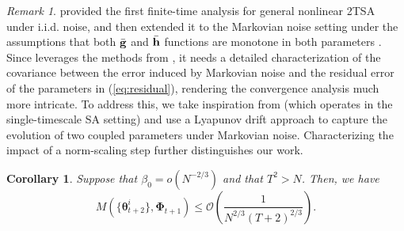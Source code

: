 \documentclass{article} %
\def\eqref#1{equation~\ref{#1}}
\theoremstyle{plain}
\newtheorem{corollary}[theorem]{Corollary}
\theoremstyle{definition}
\theoremstyle{remark}
\newtheorem{remark}[theorem]{Remark}
\renewcommand{\eqref}[1]{(\ref{#1})}
\begin{document}
\begin{remark}\label{remark:thm1}
\cite{doan2022nonlinear} provided the first finite-time analysis for general nonlinear 2TSA under i.i.d. noise, and then extended it to the Markovian noise setting under the assumptions that both $\bar{{\mathbf{g}}}$ and $\bar{\mathbf{h}}$ functions are monotone in both parameters \citep{doan2021finite}. Since \cite{doan2021finite} leverages the methods from \cite{doan2022nonlinear}, it needs a detailed characterization of the covariance between the error induced by Markovian noise and the residual error of the parameters in \eqref{eq:residual}, rendering the convergence analysis much more intricate. To address this, %
we take inspiration from \citep{srikant2019finite} (which operates in the single-timescale SA setting) and use a Lyapunov drift approach to capture the evolution of two coupled parameters under Markovian noise. Characterizing the impact of a norm-scaling step further distinguishes our work. 


\end{remark}

\begin{corollary}\label{cor:linearspeedp}
Suppose that $\beta_0=o(N^{-2/3})$ and that $T^2 > N$. Then, we have 
\[
M(\{\pmb{\theta}_{t+2}^i\}, \pmb{\Phi}_{t+1})\leq \mathcal{O}\left(\frac{1}{N^{2/3}(T+2)^{2/3}}\right).
\]
\end{corollary}
\end{document}
